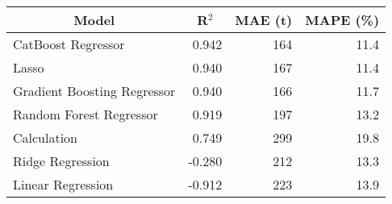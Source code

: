 
\begin{tabular}[t]{lrrr}
\toprule
\multicolumn{1}{c}{Model} & \multicolumn{1}{c}{R$^2$} & \multicolumn{1}{c}{MAE (t)} & \multicolumn{1}{c}{MAPE (\%)}\\
\midrule
CatBoost Regressor & 0.942 & 164 & 11.4\\
Lasso & 0.940 & 167 & 11.4\\
Gradient Boosting Regressor & 0.940 & 166 & 11.7\\
Random Forest Regressor & 0.919 & 197 & 13.2\\
Calculation & 0.749 & 299 & 19.8\\
Ridge Regression & -0.280 & 212 & 13.3\\
Linear Regression & -0.912 & 223 & 13.9\\
\bottomrule
\end{tabular}
